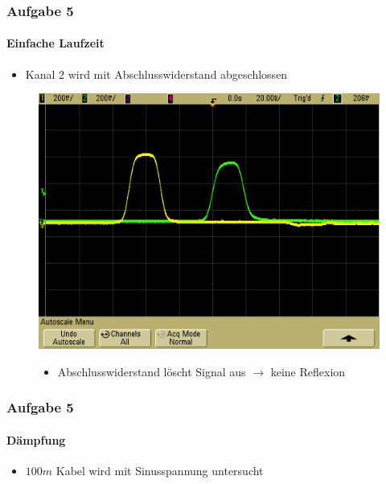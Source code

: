 \begin{frame}
    \frametitle{Aufgabe 5}
    \framesubtitle{Einfache Laufzeit}
    \begin{itemize}
        \item Kanal 2 wird mit Abschlusswiderstand abgeschlossen
    \end{itemize}
    \begin{figure}[H]
    \begin{center}
            \includegraphics[scale=0.2]{./img/5c_zweiterKanal_Abschlusswiserstand_1.png}
    \end{center}
    \begin{itemize}
        \item Abschlusswiderstand löscht Signal aus $\rightarrow$ keine
        Reflexion
    \end{itemize}
    \end{figure}
\end{frame}
\begin{frame}
    \frametitle{Aufgabe 5}
    \framesubtitle{Dämpfung}
    \begin{itemize}
        \item $100m$ Kabel wird mit Sinusspannung untersucht
    \end{itemize}
\end{frame}
